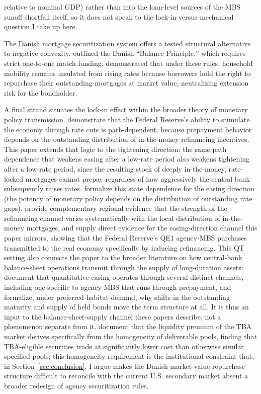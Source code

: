 \documentclass[12pt]{article}
\begin{document}
relative to nominal GDP) rather than into the loan-level sources of the MBS runoff shortfall itself, so it does not speak to the lock-in-versus-mechanical question I take up here.

The Danish mortgage securitization system offers a tested structural alternative to negative convexity. \citet{berg2018} outlined the Danish ``Balance Principle,'' which requires strict one-to-one match funding. \citet{berger2026} demonstrated that under these rules, household mobility remains insulated from rising rates because borrowers hold the right to repurchase their outstanding mortgages at market value, neutralizing extension risk for the bondholder.

A final strand situates the lock-in effect within the broader theory of monetary policy transmission. \citet{berger2021} demonstrate that the Federal Reserve's ability to stimulate the economy through rate cuts is path-dependent, because prepayment behavior depends on the outstanding distribution of in-the-money refinancing incentives. This paper extends that logic to the tightening direction: the same path dependence that weakens easing after a low-rate period also weakens tightening after a low-rate period, since the resulting stock of deeply in-the-money, rate-locked mortgages cannot prepay regardless of how aggressively the central bank subsequently raises rates. \citet{eichenbaum2022} formalize this state dependence for the easing direction (the potency of monetary policy depends on the distribution of outstanding rate gaps). \citet{beraja2019} provide complementary regional evidence that the strength of the refinancing channel varies systematically with the local distribution of in-the-money mortgages, and \citet{dimaggio2020} supply direct evidence for the easing-direction channel this paper mirrors, showing that the Federal Reserve's QE1 agency-MBS purchases transmitted to the real economy specifically by inducing refinancing. This QT setting also connects the paper to the broader literature on how central-bank balance-sheet operations transmit through the supply of long-duration assets: \citet{krishnamurthy2011} document that quantitative easing operates through several distinct channels, including one specific to agency MBS that runs through prepayment, and \citet{vayanos2021} formalize, under preferred-habitat demand, why shifts in the outstanding maturity and supply of held bonds move the term structure at all. It is thus an input to the balance-sheet-supply channel these papers describe, not a phenomenon separate from it. \citet{vickery2013} document that the liquidity premium of the TBA market derives specifically from the homogeneity of deliverable pools, finding that TBA-eligible securities trade at significantly lower cost than otherwise similar specified pools; this homogeneity requirement is the institutional constraint that, in Section~\ref{sec:conclusion}, I argue makes the Danish market-value repurchase structure difficult to reconcile with the current U.S. secondary market absent a broader redesign of agency securitization rules.
\end{document}
